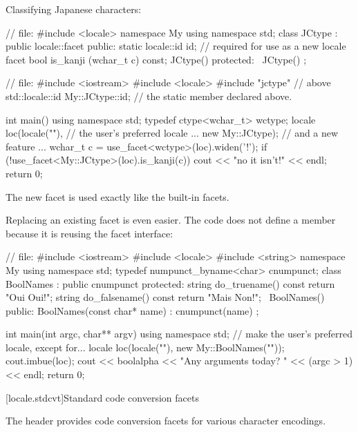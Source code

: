 \pnum
\enterexample
Classifying Japanese characters:

\begin{codeblock}
// file: 
#include <locale>
namespace My {
  using namespace std;
  class JCtype : public locale::facet {
  public:
    static locale::id id;       // required for use as a new locale facet
    bool is_kanji (wchar_t c) const;
    JCtype() { }
  protected:
    ~JCtype() { }
  };
}

// file: 
#include <iostream>
#include <locale>
#include "jctype"               // above
std::locale::id My::JCtype::id; // the static  member declared above.

int main() {
  using namespace std;
  typedef ctype<wchar_t> wctype;
  locale loc(locale(""),        // the user's preferred locale ...
         new My::JCtype);       // and a new feature ...
  wchar_t c = use_facet<wctype>(loc).widen('!');
  if (!use_facet<My::JCtype>(loc).is_kanji(c))
    cout << "no it isn't!" << endl;
  return 0;
}
\end{codeblock}

\pnum
The new facet is used exactly like the built-in facets.
\exitexample

\pnum
\enterexample
Replacing an existing facet is even easier.
The code does not define a member
because it is reusing the
facet interface:

\begin{codeblock}
// file: 
#include <iostream>
#include <locale>
#include <string>
namespace My {
  using namespace std;
  typedef numpunct_byname<char> cnumpunct;
  class BoolNames : public cnumpunct {
  protected:
    string do_truename()  const { return "Oui Oui!"; }
    string do_falsename() const { return "Mais Non!"; }
    ~BoolNames() { }
  public:
    BoolNames(const char* name) : cnumpunct(name) { }
  };
}

int main(int argc, char** argv) {
  using namespace std;
  // make the user's preferred locale, except for...
  locale loc(locale(""), new My::BoolNames(""));
  cout.imbue(loc);
  cout << boolalpha << "Any arguments today? " << (argc > 1) << endl;
  return 0;
}
\end{codeblock}
\exitexample

[locale.stdcvt]{Standard code conversion facets}

\pnum
The header  provides code conversion facets for various character encodings.

